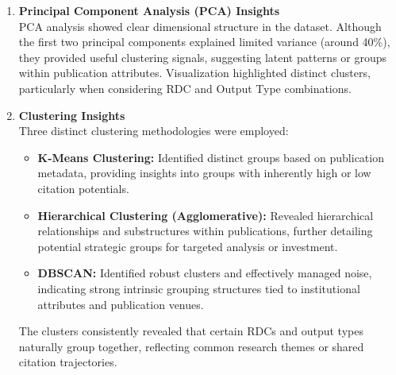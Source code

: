 \documentclass[12pt]{article}
\begin{document}
\begin{enumerate}
  \item \textbf{Principal Component Analysis (PCA) Insights}\\
    PCA analysis showed clear dimensional structure in the dataset. Although the first two principal components explained limited variance (around 40\%), they provided useful clustering signals, suggesting latent patterns or groups within publication attributes. Visualization highlighted distinct clusters, particularly when considering RDC and Output Type combinations.

  \item \textbf{Clustering Insights}\\
    Three distinct clustering methodologies were employed:
    \begin{itemize}
      \item \textbf{K-Means Clustering:} Identified distinct groups based on publication metadata, providing insights into groups with inherently high or low citation potentials.
      \item \textbf{Hierarchical Clustering (Agglomerative):} Revealed hierarchical relationships and substructures within publications, further detailing potential strategic groups for targeted analysis or investment.
      \item \textbf{DBSCAN:} Identified robust clusters and effectively managed noise, indicating strong intrinsic grouping structures tied to institutional attributes and publication venues.
    \end{itemize}
    The clusters consistently revealed that certain RDCs and output types naturally group together, reflecting common research themes or shared citation trajectories.


\end{enumerate}
\end{document}
